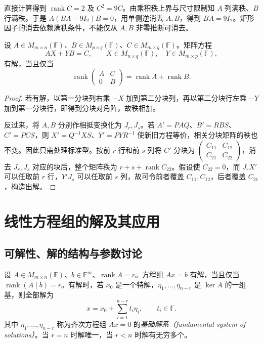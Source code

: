 \begin{solve}
直接计算得到 $\operatorname{rank}C=2$ 及 $C^2=9C$。由乘积秩上界与尺寸限制知 $A$ 列满秩、$B$ 行满秩。于是 $A(BA-9I_2)B=0$，用单侧逆消去 $A,B$，得到 $BA=9I_2$。矩形因子的消去依赖满秩条件，不能仅从 $A,B$ 非零推断可消去。
\end{solve}

\begin{proposition}
\label{prop:laex-two-sided-equation}
设 $A\in M_{m\times n}(\mathbb F)$、$B\in M_{p\times q}(\mathbb F)$、$C\in M_{m\times q}(\mathbb F)$。矩阵方程
\[
AX+YB=C,\qquad
X\in M_{n\times q}(\mathbb F),\quad Y\in M_{m\times p}(\mathbb F),
\]
有解，当且仅当
\[
\operatorname{rank}\begin{pmatrix}A&C\\0&B\end{pmatrix}
=\operatorname{rank}A+\operatorname{rank}B.
\]
\end{proposition}

\begin{proof}
若有解，以第一分块列右乘 $-X$ 加到第二分块列，再以第二分块行左乘 $-Y$ 加到第一分块行，即得到分块对角阵，故秩相加。

反过来，将 $A,B$ 分别作相抵变换化为 $J_r,J_s$。若 $A'=PAQ$、$B'=RBS$、$C'=PCS$，则 $X'=Q^{-1}XS$、$Y'=PYR^{-1}$ 使新旧方程等价，相关分块矩阵的秩也不变。因此只需处理标准型。按前 $r$ 行和前 $s$ 列将 $C'$ 分块为 $\begin{pmatrix}C_{11}&C_{12}\\C_{21}&C_{22}\end{pmatrix}$，消去 $J_r,J_s$ 对应的块后，整个矩阵秩为 $r+s+\operatorname{rank}C_{22}$。假设使 $C_{22}=0$，而 $J_rX'$ 可以任取前 $r$ 行，$Y'J_s$ 可以任取前 $s$ 列，故可令前者覆盖 $C_{11},C_{12}$，后者覆盖 $C_{21}$，构造出解。
\end{proof}

\section{线性方程组的解及其应用}
\label{sec:laex-linear-systems}

\subsection{可解性、解的结构与参数讨论}

\begin{theorem}
\label{thm:laex-system-structure}
设 $A\in M_{m\times n}(\mathbb F)$、$b\in\mathbb F^m$、$\operatorname{rank}A=r$。方程组 $Ax=b$ 有解，当且仅当 $\operatorname{rank}(A\mid b)=r$。有解时，若 $x_0$ 是一个特解，$\eta_1,\ldots,\eta_{n-r}$ 是 $\ker A$ 的一组基，则全部解为
\begin{equation}
\label{eq:laex-affine-solution}
x=x_0+\sum_{i=1}^{n-r}t_i\eta_i,\qquad t_i\in\mathbb F.
\end{equation}
其中 $\eta_1,\ldots,\eta_{n-r}$ 称为齐次方程组 $Ax=0$ 的\emph{基础解系（fundamental system of solutions）}。当 $r=n$ 时解唯一，当 $r<n$ 时解有无穷多个。
\end{theorem}

